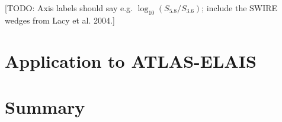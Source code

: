 \documentclass[fleqn,usenatbib,usedcolumn]{mnras}
\begin{document}
  {[}TODO: Axis labels should say e.g. \(\log_{10}(S_{5.8}/S_{3.6})\);
  include the SWIRE wedges from Lacy et al. 2004.{]}

\section{Application to ATLAS-ELAIS}

\section{Summary}
%





\bsp	%
\label{lastpage}
\end{document}
